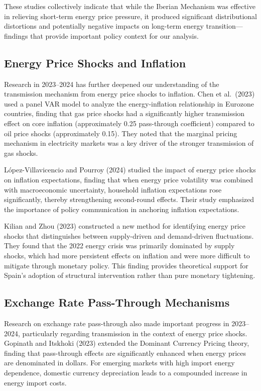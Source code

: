 \documentclass[12pt, a4paper]{article}
\begin{document}
These studies collectively indicate that while the Iberian Mechanism was effective in relieving short-term energy price pressure, it produced significant distributional distortions and potentially negative impacts on long-term energy transition---findings that provide important policy context for our analysis.


\subsection{Energy Price Shocks and Inflation}

Research in 2023--2024 has further deepened our understanding of the transmission mechanism from energy price shocks to inflation. Chen et al.\ (2023) used a panel VAR model to analyze the energy-inflation relationship in Eurozone countries, finding that gas price shocks had a significantly higher transmission effect on core inflation (approximately 0.25 pass-through coefficient) compared to oil price shocks (approximately 0.15). They noted that the marginal pricing mechanism in electricity markets was a key driver of the stronger transmission of gas shocks.

L\'{o}pez-Villavicencio and Pourroy (2024) studied the impact of energy price shocks on inflation expectations, finding that when energy price volatility was combined with macroeconomic uncertainty, household inflation expectations rose significantly, thereby strengthening second-round effects. Their study emphasized the importance of policy communication in anchoring inflation expectations.

Kilian and Zhou (2023) constructed a new method for identifying energy price shocks that distinguishes between supply-driven and demand-driven fluctuations. They found that the 2022 energy crisis was primarily dominated by supply shocks, which had more persistent effects on inflation and were more difficult to mitigate through monetary policy. This finding provides theoretical support for Spain's adoption of structural intervention rather than pure monetary tightening.


\subsection{Exchange Rate Pass-Through Mechanisms}

Research on exchange rate pass-through also made important progress in 2023--2024, particularly regarding transmission in the context of energy price shocks. Gopinath and Itskhoki (2023) extended the Dominant Currency Pricing theory, finding that pass-through effects are significantly enhanced when energy prices are denominated in dollars. For emerging markets with high import energy dependence, domestic currency depreciation leads to a compounded increase in energy import costs.
\end{document}
